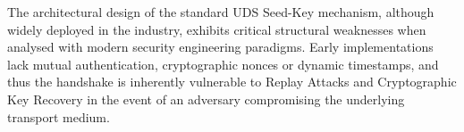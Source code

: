 \vspace{1em} %

The architectural design of the standard UDS Seed-Key mechanism, although widely deployed in the industry, exhibits critical structural weaknesses when analysed with modern security engineering paradigms. Early implementations lack mutual authentication, cryptographic nonces or dynamic timestamps, and thus the handshake is inherently vulnerable to Replay Attacks and Cryptographic Key Recovery in the event of an adversary compromising the underlying transport medium.